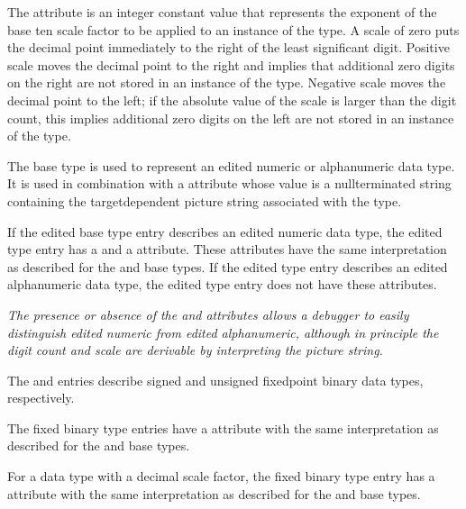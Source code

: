 \hypertarget{chap:DWATdecimalscaledecimalscalefactor}{}
The \DWATdecimalscale{}
attribute 
is an integer constant value
that represents the exponent of the base ten scale factor to
be applied to an instance of the type. A scale of zero puts the
decimal point immediately to the right of the least significant
digit. Positive scale moves the decimal point to the right
and implies that additional zero digits on the right are not
stored in an instance of the type. Negative scale moves the
decimal point to the left; if the absolute value of the scale
is larger than the digit count, this implies additional zero
digits on the left are not stored in an instance of the type.

The \DWATEedited{}
base 
\hypertarget{chap:DWATpicturestringpicturestringfornumericstringtype}{}
type is used to represent an edited
numeric or alphanumeric data type. It is used in combination
with a \DWATpicturestring{} attribute whose value is a 
null\dash terminated string containing the target\dash dependent picture
string associated with the type.

If the edited base type entry describes an edited numeric
data type, the edited type entry has a \DWATdigitcount{} and a
\DWATdecimalscale{} attribute. 
These attributes have the same
interpretation as described for the 
\DWATEpackeddecimal{} and
\DWATEnumericstring{} base 
types. If the edited type entry
describes an edited alphanumeric data type, the edited type
entry does not have these attributes.


\textit{The presence or absence of the \DWATdigitcount{} and
\DWATdecimalscale{} attributes 
allows a debugger to easily
distinguish edited numeric from edited alphanumeric, although
in principle the digit count and scale are derivable by
interpreting the picture string.}

The \DWATEsignedfixed{} and \DWATEunsignedfixed{} entries
describe signed and unsigned fixed\dash point binary data types,
respectively.

The fixed binary type entries have 
a 
\DWATdigitcount{}
attribute with the same interpretation as described for the
\DWATEpackeddecimal{} and \DWATEnumericstring{} base types.

For a data type with a decimal scale factor, the fixed binary
type entry has a 
\DWATdecimalscale{} attribute 
with the same
interpretation as described for the 
\DWATEpackeddecimal{}
and \DWATEnumericstring{} base types.


